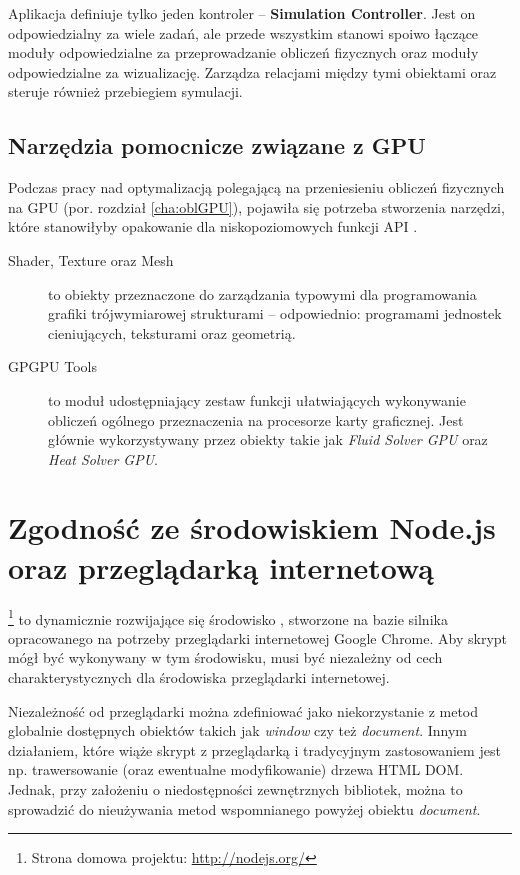 Aplikacja \en definiuje tylko jeden kontroler -- \textbf{Simulation Controller}.
Jest on odpowiedzialny za wiele zadań, ale przede wszystkim stanowi spoiwo
łączące moduły odpowiedzialne za przeprowadzanie obliczeń fizycznych oraz moduły
odpowiedzialne za wizualizację. Zarządza relacjami między tymi obiektami oraz
steruje również przebiegiem symulacji.

\subsection{Narzędzia pomocnicze związane z GPU}

Podczas pracy nad optymalizacją polegającą na przeniesieniu obliczeń fizycznych
na GPU (por. rozdział \ref{cha:oblGPU}), pojawiła się potrzeba stworzenia
narzędzi, które stanowiłyby opakowanie dla niskopoziomowych funkcji API
. 

\begin{description}

\item[Shader, Texture oraz Mesh] to obiekty przeznaczone do zarządzania
typowymi dla programowania grafiki trójwymiarowej strukturami -- odpowiednio:
programami jednostek cieniujących, teksturami oraz geometrią.

\item[GPGPU Tools] to moduł udostępniający zestaw funkcji ułatwiających
wykonywanie obliczeń ogólnego przeznaczenia na procesorze karty graficznej.
Jest głównie wykorzystywany przez obiekty takie jak \emph{Fluid Solver GPU}
oraz \emph{Heat Solver GPU}.

\end{description}


\section{Zgodność ze środowiskiem Node.js oraz przeglądarką internetową}
\label{sec:zgodNode.js}

\footnote{Strona domowa projektu: \url{http://nodejs.org/}} to
dynamicznie rozwijające się środowisko , stworzone na bazie
silnika  opracowanego na potrzeby przeglądarki internetowej Google
Chrome. Aby skrypt mógł być wykonywany w tym środowisku, musi być niezależny od
cech charakterystycznych dla środowiska przeglądarki internetowej.

Niezależność od przeglądarki można zdefiniować jako niekorzystanie z metod
globalnie dostępnych obiektów takich jak \emph{window} czy też \emph{document}.
Innym działaniem, które wiąże skrypt z przeglądarką i tradycyjnym zastosowaniem
jest np. trawersowanie (oraz ewentualne modyfikowanie) drzewa HTML DOM. Jednak,
przy założeniu o niedostępności zewnętrznych bibliotek, można to sprowadzić do
nieużywania metod wspomnianego powyżej obiektu \emph{document}.


